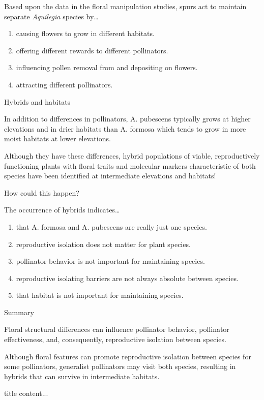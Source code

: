\documentclass[t,hidelinks]{beamer}
\newcommand{\ques}[1]{\highlight{\textsc{q#1:}}}
\begin{document}
%
\begin{frame}[t]{\ques{15} Based upon the data in the floral manipulation studies, spurs act to maintain separate \textit{Aquilegia} species by\dots}
	
	\begin{enumerate}
		\item causing flowers to grow in different habitats.
		\item offering different rewards to different pollinators.
		\item influencing pollen removal from and depositing on flowers. 
		\item attracting different pollinators.
	\end{enumerate}
\end{frame}
%
\begin{frame}[t]{Hybrids and habitats}
	
	\hangpara In addition to differences in pollinators, A. pubescens typically grows at higher elevations and in drier habitats than A. formosa which tends to grow in more moist habitats at lower elevations.

	\hangpara Although they have these differences, hybrid populations of viable, reproductively functioning plants with floral traits and molecular markers characteristic of both species have been identified at intermediate elevations and habitats!

	\hangpara How could this happen? 

\end{frame}
%
\begin{frame}[t]{\ques{16} The occurrence of hybrids indicates\dots}
	
	\begin{enumerate}
		\item that A. formosa and A. pubescens are really just one species.
		\item reproductive isolation does not matter for plant species.
		\item pollinator behavior is not important for maintaining species.
		\item reproductive isolating barriers are not always absolute between species.
		\item that habitat is not important for maintaining species.
	\end{enumerate}
\end{frame}
%
\begin{frame}[t]{Summary}
	
	\hangpara Floral structural differences can influence pollinator behavior, pollinator effectiveness, and, consequently, reproductive isolation between species. 

	\hangpara Although floral features can promote reproductive isolation between species for some pollinators, generalist pollinators may visit both species, resulting in hybrids that can survive in intermediate habitats. 
\end{frame}
%

%
\begin{frame}[t]{title}
	content...
\end{frame}
\end{document}
